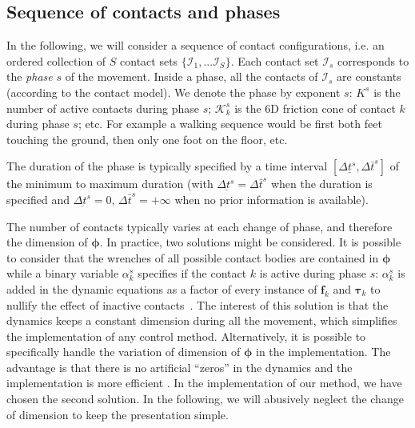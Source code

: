 \subsection{Sequence of contacts and phases}

In the following, we will consider a sequence of contact configurations, i.e. an ordered collection of $S$ contact sets $\{ \mathcal{I}_1, ... \mathcal{I}_S \}$. Each contact set $\mathcal{I}_s$ corresponds to the \emph{phase} $s$ of the movement. Inside a phase, all the contacts of $\mathcal{I}_s$ are constants (according to the contact model). We denote the phase by exponent $s$: $K^s$ is the number of active contacts during phase $s$;  $\mathcal{K}_k^s$ is the 6D friction cone of contact $k$ during phase $s$; etc. For example a walking sequence would be first both feet touching the ground, then only one foot on the floor, etc. 

The duration of the phase is typically specified by a time interval $\left[ \Delta \underline{ t}^s, \Delta  \bar t^s \right]$ of the minimum to maximum duration (with $\Delta \underbar t^s = \Delta \bar t^s$ when the duration is specified and $\Delta \underbar t^s = 0$, $\Delta \bar t^s = +\infty$ when no prior information is available).

The number of contacts typically varies at each change of phase, and therefore the dimension of $\bm \phi$. In practice, two solutions might be considered. It is possible to consider that the wrenches of all possible contact bodies are contained in $\bm \phi$ while a binary variable $\alpha_k^s$ specifies if the contact $k$ is active during phase $s$: $\alpha_k^s$ is added in the dynamic equations as a factor of every instance of $\bm f_k$ and $\bm \tau_k$ to nullify the effect of inactive contacts~\cite{rotella_humanoid15}. The interest of this solution is that the dynamics keeps a constant dimension during all the movement, which simplifies the implementation of any control method.
%
Alternatively, it is possible to specifically handle the variation of dimension of $\bm \phi$ in the implementation. The advantage is that there is no artificial ``zeros'' in the dynamics and the implementation is more efficient \cite{kudruss_ichr15}.
%
In the implementation of our method, we have chosen the second solution. In the following, we will abusively neglect the change of dimension to keep the presentation simple.

